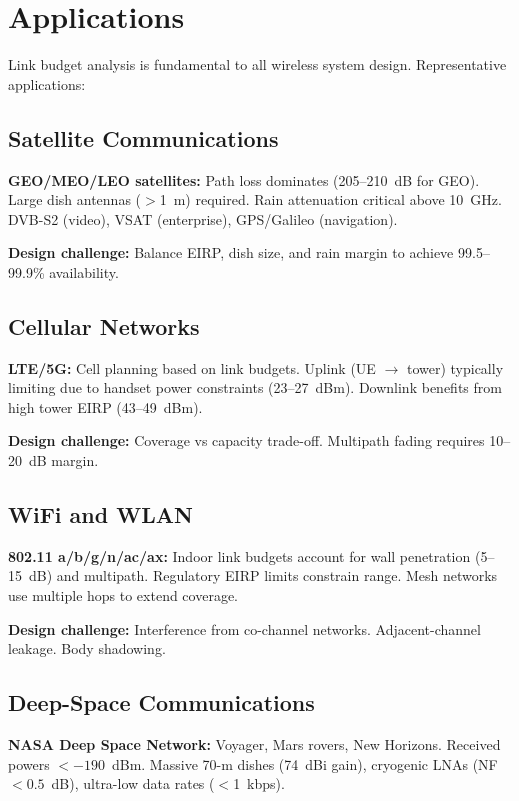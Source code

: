 \section{Applications}

Link budget analysis is fundamental to all wireless system design. Representative applications:

\subsection{Satellite Communications}

\textbf{GEO/MEO/LEO satellites:} Path loss dominates (205--210~dB for GEO). Large dish antennas ($>$1~m) required. Rain attenuation critical above 10~GHz. DVB-S2 (video), VSAT (enterprise), GPS/Galileo (navigation).

\textbf{Design challenge:} Balance EIRP, dish size, and rain margin to achieve 99.5--99.9\% availability.

\subsection{Cellular Networks}

\textbf{LTE/5G:} Cell planning based on link budgets. Uplink (UE $\rightarrow$ tower) typically limiting due to handset power constraints (23--27~dBm). Downlink benefits from high tower EIRP (43--49~dBm).

\textbf{Design challenge:} Coverage vs capacity trade-off. Multipath fading requires 10--20~dB margin.

\subsection{WiFi and WLAN}

\textbf{802.11 a/b/g/n/ac/ax:} Indoor link budgets account for wall penetration (5--15~dB) and multipath. Regulatory EIRP limits constrain range. Mesh networks use multiple hops to extend coverage.

\textbf{Design challenge:} Interference from co-channel networks. Adjacent-channel leakage. Body shadowing.

\subsection{Deep-Space Communications}

\textbf{NASA Deep Space Network:} Voyager, Mars rovers, New Horizons. Received powers $< -190$~dBm. Massive 70-m dishes (74~dBi gain), cryogenic LNAs (NF $< 0.5$~dB), ultra-low data rates ($<$1~kbps).

